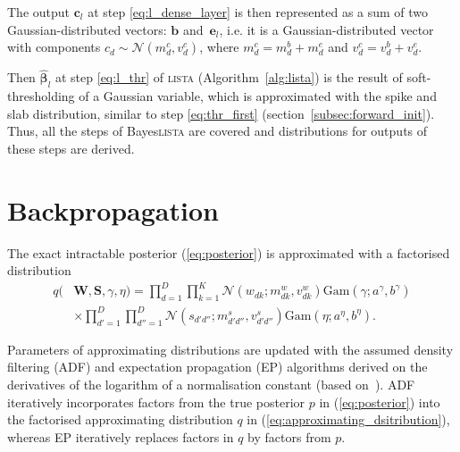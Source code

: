 \documentclass{article}
\begin{document}
  The output $\mathbf{c}_l$ at step \ref{eq:l_dense_layer} is then represented as a sum of two Gaussian-distributed vectors: $\mathbf{b}$ and~$\mathbf{e}_l$, i.e. it is a Gaussian-distributed vector with components $c_{d} \sim \mathcal{N}(m^c_{d}, v^c_{d})$, where $m^c_{d} = m^b_{d} + m^e_{d}$ and $v^c_{d} = v^b_{d} + v^e_{d}$.
  
  
  Then $\widehat{\boldsymbol\beta}_{l}$ at step \ref{eq:l_thr} of \textsc{lista} (Algorithm~\ref{alg:lista}) is the result of soft-thresholding of a Gaussian variable, which is approximated with the spike and slab distribution,  similar to step \ref{eq:thr_first} (section~\ref{subsec:forward_init}).
  Thus, all the steps of Bayes\textsc{lista} are covered and distributions for outputs of these steps are derived.
  
  \section{Backpropagation}
  \label{sec:backpropagation}
  
  The exact intractable posterior (\ref{eq:posterior}) is approximated with a factorised distribution
  \begin{align}
  q(&\mathbf{W}, \mathbf{S}, \gamma, \eta) = \prod_{d=1}^D\prod_{k=1}^K \mathcal{N}(w_{dk} ; m^w_{dk}, v^w_{dk}) \text{Gam}(\gamma; a^\gamma, b^\gamma)\nonumber\\
  \label{eq:approximating_dsitribution}
  &\times\prod_{d'=1}^D\prod_{d''=1}^D \mathcal{N}(s_{d'd''} ; m^s_{d'd''}, v^s_{d'd''}) \text{Gam}(\eta; a^\eta, b^\eta).
  \end{align}
  
  Parameters of approximating distributions are updated with the assumed density filtering (ADF) and expectation propagation (EP) algorithms derived on the derivatives of the logarithm of a normalisation constant (based on~\cite{hernandez2015probabilistic}). ADF iteratively incorporates factors from the true posterior $p$ in (\ref{eq:posterior}) into the factorised approximating distribution $q$ in (\ref{eq:approximating_dsitribution}), whereas EP iteratively replaces factors in $q$ by factors from $p$.
  
\end{document}
